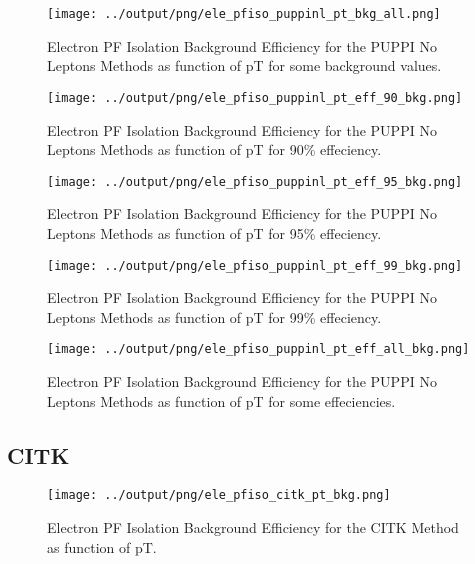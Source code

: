 \documentclass[11pt]{book}
\begin{document}
\begin{figure}[htb]
\centering
\texttt{[image: ../output/png/ele\_pfiso\_puppinl\_pt\_bkg\_all.png]}
\caption{Electron PF Isolation Background Efficiency for the PUPPI No Leptons Methods as function of pT for some background values.}
\label{fig:ele_pfiso_pt_bkg_puppinl_bkg_all}
\end{figure}


\begin{figure}[htb]
\centering
\texttt{[image: ../output/png/ele\_pfiso\_puppinl\_pt\_eff\_90\_bkg.png]}
\caption{Electron PF Isolation Background Efficiency for the PUPPI No Leptons Methods as function of pT for 90\% effeciency.}
\label{fig:ele_pfiso_pt_eff_puppinl_eff_90_bkg}
\end{figure}

\begin{figure}[htb]
\centering
\texttt{[image: ../output/png/ele\_pfiso\_puppinl\_pt\_eff\_95\_bkg.png]}
\caption{Electron PF Isolation Background Efficiency for the PUPPI No Leptons Methods as function of pT for 95\% effeciency.}
\label{fig:ele_pfiso_pt_eff_puppinl_eff_95_bkg}
\end{figure}

\begin{figure}[htb]
\centering
\texttt{[image: ../output/png/ele\_pfiso\_puppinl\_pt\_eff\_99\_bkg.png]}
\caption{Electron PF Isolation Background Efficiency for the PUPPI No Leptons Methods as function of pT for 99\% effeciency.}
\label{fig:ele_pfiso_pt_eff_puppinl_eff_99_bkg}
\end{figure}

\begin{figure}[htb]
\centering
\texttt{[image: ../output/png/ele\_pfiso\_puppinl\_pt\_eff\_all\_bkg.png]}
\caption{Electron PF Isolation Background Efficiency for the PUPPI No Leptons Methods as function of pT for some effeciencies.}
\label{fig:ele_pfiso_pt_eff_puppinl_eff_all_bkg}
\end{figure}
\clearpage

\subsection{CITK}
\begin{figure}[htb]
\centering
\texttt{[image: ../output/png/ele\_pfiso\_citk\_pt\_bkg.png]}
\caption{Electron PF Isolation Background Efficiency for the CITK Method as function of pT.}
\label{fig:ele_pfiso_pt_bkg_citk}
\end{figure}
\end{document}
